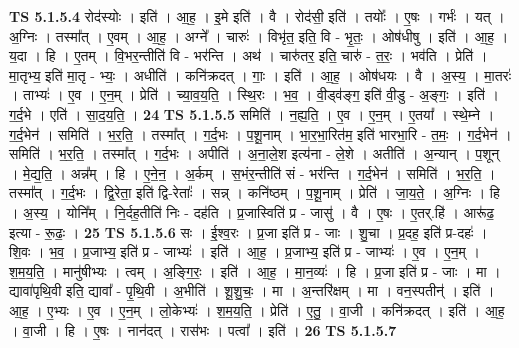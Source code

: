 \documentclass[17pt]{extarticle}
\begin{document}
                  \newline
                                \textbf{ TS 5.1.5.4} \newline
                  रोद॑स्योः । इति॑ । आ॒ह॒ । इ॒मे इति॑ । वै । रोद॑सी॒ इति॑ । तयोः᳚ । ए॒षः । गर्भः॑ । यत् । अ॒ग्निः । तस्मा᳚त् । ए॒वम् । आ॒ह॒ । अग्ने᳚ । चारुः॑ । विभृ॑त॒ इति॒ वि - भृ॒तः॒ । ओष॑धीषु । इति॑ । आ॒ह॒ । य॒दा । हि । ए॒तम् । वि॒भर॒न्तीति॑ वि - भर॑न्ति । अथ॑ । चारु॑तर॒ इति॒ चारु॑ - त॒रः॒ । भव॑ति । प्रेति॑ । मा॒तृभ्य॒ इति॑ मा॒तृ - भ्यः॒ । अधीति॑ । कनि॑क्रदत् । गाः॒ । इति॑ । आ॒ह॒ । ओष॑धयः । वै । अ॒स्य॒ । मा॒तरः॑ । ताभ्यः॑ । ए॒व । ए॒न॒म् । प्रेति॑ । च्या॒व॒य॒ति॒ । स्थि॒रः । भ॒व॒ । वी॒ड्व॑ङ्ग॒ इति॑ वी॒डु - अ॒ङ्गः॒ । इति॑ । ग॒र्द॒भे । एति॑ । सा॒द॒य॒ति॒ । \textbf{  24} \newline
                  \newline
                                \textbf{ TS 5.1.5.5} \newline
                  समिति॑ । न॒ह्य॒ति॒ । ए॒व । ए॒न॒म् । ए॒तया᳚ । स्थे॒म्ने । ग॒र्द॒भेन॑ । समिति॑ । भ॒र॒ति॒ । तस्मा᳚त् । ग॒र्द॒भः । प॒शू॒नाम् । भा॒र॒भा॒रित॑म॒ इति॑ भारभा॒रि - त॒मः॒ । ग॒र्द॒भेन॑ । समिति॑ । भ॒र॒ति॒ । तस्मा᳚त् । ग॒र्द॒भः । अपीति॑ । अ॒ना॒ले॒श इत्य॑ना - ले॒शे । अतीति॑ । अ॒न्यान् । प॒शून् । मे॒द्य॒ति॒ । अन्न᳚म् । हि । ए॒ने॒न॒ । अ॒र्कम् । स॒भंर॒न्तीति॑ सं - भर॑न्ति । ग॒र्द॒भेन॑ । समिति॑ । भ॒र॒ति॒ । तस्मा᳚त् । ग॒र्द॒भः । द्वि॒रेता॒ इति॑ द्वि-रेताः᳚ । सन्न् । कनि॑ष्ठम् । प॒शू॒नाम् । प्रेति॑ । जा॒य॒ते॒ । अ॒ग्निः । हि । अ॒स्य॒ । योनि᳚म् । नि॒र्दह॒तीति॑ निः - दह॑ति । प्र॒जास्विति॑ प्र - जासु॑ । वै । ए॒षः । ए॒तर्.हि॑ । आरू॑ढ॒ इत्या - रू॒ढः॒ । \textbf{  25} \newline
                  \newline
                                \textbf{ TS 5.1.5.6} \newline
                  सः । ई॒श्व॒रः । प्र॒जा इति॑ प्र - जाः । शु॒चा । प्र॒दह॒ इति॑ प्र-दहः॑ । शि॒वः । भ॒व॒ । प्र॒जाभ्य॒ इति॑ प्र - जाभ्यः॑ । इति॑ । आ॒ह॒ । प्र॒जाभ्य॒ इति॑ प्र - जाभ्यः॑ । ए॒व । ए॒न॒म् । श॒म॒य॒ति॒ । मानु॑षीभ्यः । त्वम् । अ॒ङ्गि॒रः॒ । इति॑ । आ॒ह॒ । मा॒न॒व्यः॑ । हि । प्र॒जा इति॑ प्र - जाः । मा । द्यावा॑पृथि॒वी इति॒ द्यावा᳚ - पृ॒थि॒वी । अ॒भीति॑ । शू॒शु॒चः॒ । मा । अ॒न्तरि॑क्षम् । मा । वन॒स्पतीन्॑ । इति॑ । आ॒ह॒ । ए॒भ्यः । ए॒व । ए॒न॒म् । लो॒केभ्यः॑ । श॒म॒य॒ति॒ । प्रेति॑ । ए॒तु॒ । वा॒जी । कनि॑क्रदत् । इति॑ । आ॒ह॒ । वा॒जी । हि । ए॒षः । नान॑दत् । रास॑भः । पत्वा᳚ । इति॑ । \textbf{  26} \newline
                  \newline
                                \textbf{ TS 5.1.5.7} \newline
\end{document}
